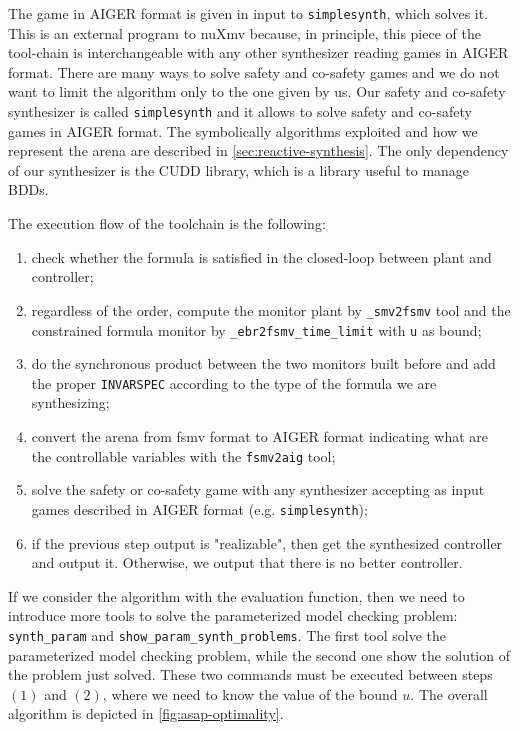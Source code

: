The game in AIGER format is given in input to \lstinline{simplesynth}, which solves it.
This is an external program to nuXmv because, in principle, this piece of the tool-chain is interchangeable with any other synthesizer reading games in AIGER format.
There are many ways to solve safety and co-safety games and we do not want to limit the algorithm only to the one given by us.
Our safety and co-safety synthesizer is called \lstinline{simplesynth} and it allows to solve safety and co-safety games in AIGER format.
The symbolically algorithms exploited and how we represent the arena are described in \autoref{sec:reactive-synthesis}.
The only dependency of our synthesizer is the CUDD library, which is a library useful to manage BDDs.

The execution flow of the toolchain is the following: 
\begin{enumerate}[label=\enumpar]
    \item check whether the formula is satisfied in the closed-loop between plant and controller;
    \item regardless of the order, compute the monitor plant by \lstinline{_smv2fsmv} tool and the constrained formula monitor by \lstinline{_ebr2fsmv_time_limit} with \lstinline{u} as bound;
    \item do the synchronous product between the two monitors built before and add the proper \lstinline{INVARSPEC} according to the type of the formula we are synthesizing; 
    \item convert the arena from fsmv format to AIGER format indicating what are the controllable variables with the \lstinline{fsmv2aig} tool;
    \item solve the safety or co-safety game with any synthesizer accepting as input games described in AIGER format (e.g. \lstinline{simplesynth});
    \item if the previous step output is "realizable", then get the synthesized controller and output it. Otherwise, we output that there is no better controller. 
\end{enumerate}

If we consider the algorithm with the evaluation function, then we need to introduce more tools to solve the parameterized model checking problem: \lstinline{synth_param} and \lstinline{show_param_synth_problems}.
The first tool solve the parameterized model checking problem, while the second one show the solution of the problem just solved.
These two commands must be executed between steps $(1)$ and $(2)$, where we need to know the value of the bound $u$. The overall algorithm is depicted in \autoref{fig:asap-optimality}.

